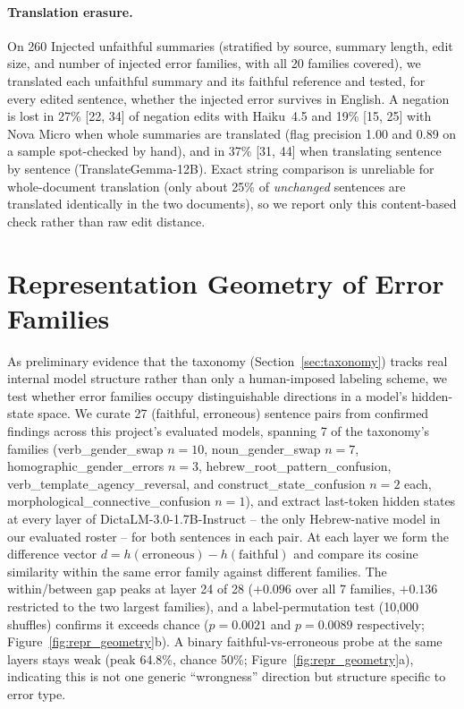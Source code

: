 \documentclass[11pt]{article}
\begin{document}
\paragraph{Translation erasure.} On 260 Injected unfaithful summaries (stratified by source, summary length, edit size, and number of injected error families, with all 20 families covered), we translated each unfaithful summary and its faithful reference and tested, for every edited sentence, whether the injected error survives in English. A negation is lost in 27\% [22, 34] of negation edits with Haiku~4.5 and 19\% [15, 25] with Nova Micro when whole summaries are translated (flag precision 1.00 and 0.89 on a sample spot-checked by hand), and in 37\% [31, 44] when translating sentence by sentence (TranslateGemma-12B). Exact string comparison is unreliable for whole-document translation (only about 25\% of \emph{unchanged} sentences are translated identically in the two documents), so we report only this content-based check rather than raw edit distance.

\section{Representation Geometry of Error Families}
\label{app:repr_geometry}
As preliminary evidence that the taxonomy (Section~\ref{sec:taxonomy}) tracks real internal model structure rather than only a human-imposed labeling scheme, we test whether error families occupy distinguishable directions in a model's hidden-state space. We curate 27 (faithful, erroneous) sentence pairs from confirmed findings across this project's evaluated models, spanning 7 of the taxonomy's families (verb\_gender\_swap $n{=}10$, noun\_gender\_swap $n{=}7$, homographic\_gender\_errors $n{=}3$, hebrew\_root\_pattern\_confusion, verb\_template\_agency\_reversal, and construct\_state\_confusion $n{=}2$ each, morphological\_connective\_confusion $n{=}1$), and extract last-token hidden states at every layer of DictaLM-3.0-1.7B-Instruct -- the only Hebrew-native model in our evaluated roster -- for both sentences in each pair. At each layer we form the difference vector $d=h(\text{erroneous})-h(\text{faithful})$ and compare its cosine similarity within the same error family against different families. The within/between gap peaks at layer 24 of 28 ($+0.096$ over all 7 families, $+0.136$ restricted to the two largest families), and a label-permutation test (10,000 shuffles) confirms it exceeds chance ($p{=}0.0021$ and $p{=}0.0089$ respectively; Figure~\ref{fig:repr_geometry}b). A binary faithful-vs-erroneous probe at the same layers stays weak (peak 64.8\%, chance 50\%; Figure~\ref{fig:repr_geometry}a), indicating this is not one generic ``wrongness'' direction but structure specific to error type.
\end{document}
